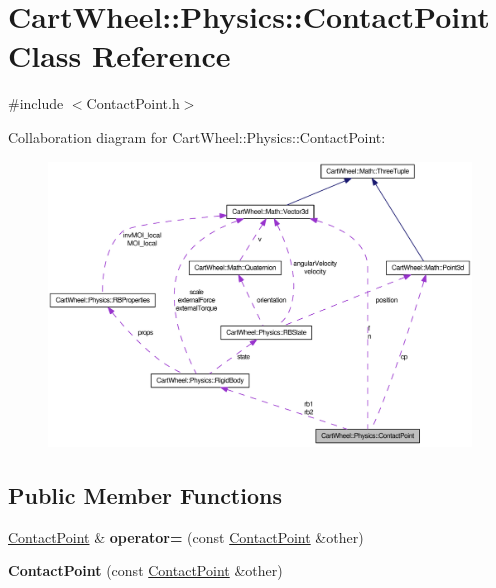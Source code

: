 \hypertarget{classCartWheel_1_1Physics_1_1ContactPoint}{
\section{CartWheel::Physics::ContactPoint Class Reference}
\label{classCartWheel_1_1Physics_1_1ContactPoint}
}


{\ttfamily \#include $<$ContactPoint.h$>$}



Collaboration diagram for CartWheel::Physics::ContactPoint:\nopagebreak
\begin{figure}[H]
\begin{center}
\leavevmode
\includegraphics[width=400pt]{classCartWheel_1_1Physics_1_1ContactPoint__coll__graph}
\end{center}
\end{figure}
\subsection*{Public Member Functions}
\begin{DoxyCompactItemize}
\item 
\hypertarget{classCartWheel_1_1Physics_1_1ContactPoint_ae797fad04999215311cacd5e04e12e0f}{
\hyperlink{classCartWheel_1_1Physics_1_1ContactPoint}{ContactPoint} \& {\bfseries operator=} (const \hyperlink{classCartWheel_1_1Physics_1_1ContactPoint}{ContactPoint} \&other)}
\label{classCartWheel_1_1Physics_1_1ContactPoint_ae797fad04999215311cacd5e04e12e0f}

\item 
\hypertarget{classCartWheel_1_1Physics_1_1ContactPoint_a6fd21af6363d8d71914cfa1ec12eff32}{
{\bfseries ContactPoint} (const \hyperlink{classCartWheel_1_1Physics_1_1ContactPoint}{ContactPoint} \&other)}
\label{classCartWheel_1_1Physics_1_1ContactPoint_a6fd21af6363d8d71914cfa1ec12eff32}

\end{DoxyCompactItemize}
